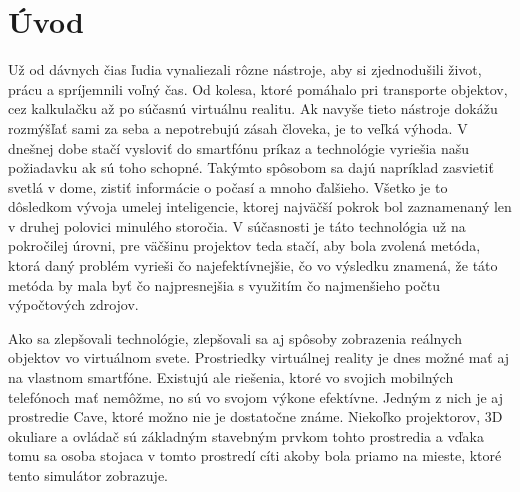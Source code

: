 \section*{Úvod}

Už od dávnych čias ľudia vynaliezali rôzne nástroje, aby si zjednodušili život, prácu a spríjemnili voľný čas.
Od kolesa, ktoré pomáhalo pri transporte objektov, cez kalkulačku až po súčasnú virtuálnu realitu.
Ak navyše tieto nástroje dokážu rozmýšľať sami za seba a nepotrebujú zásah človeka, je to veľká výhoda.
V dnešnej dobe stačí vysloviť do smartfónu príkaz a technológie vyriešia našu požiadavku ak sú toho schopné.
Takýmto spôsobom sa dajú napríklad zasvietiť svetlá v dome, zistiť informácie o počasí a mnoho ďalšieho.
Všetko je to dôsledkom vývoja umelej inteligencie, ktorej najväčší pokrok bol zaznamenaný len v druhej polovici
minulého storočia.
V súčasnosti je táto technológia už na pokročilej úrovni, pre väčšinu projektov teda stačí, aby bola zvolená metóda,
ktorá daný problém vyrieši čo najefektívnejšie, čo vo výsledku znamená, že táto metóda by mala byť čo najpresnejšia
s využitím čo najmenšieho počtu výpočtových zdrojov.

Ako sa zlepšovali technológie, zlepšovali sa aj spôsoby zobrazenia reálnych objektov vo virtuálnom svete.
Prostriedky virtuálnej reality je dnes možné mať aj na vlastnom smartfóne.
Existujú ale riešenia, ktoré vo svojich mobilných telefónoch mať nemôžme, no sú vo svojom výkone efektívne.
Jedným z nich je aj prostredie Cave, ktoré možno nie je dostatočne známe.
Niekoľko projektorov, 3D okuliare a ovládač sú základným stavebným prvkom tohto prostredia a vďaka tomu sa osoba
stojaca v tomto prostredí cíti akoby bola priamo na mieste, ktoré tento simulátor zobrazuje.
